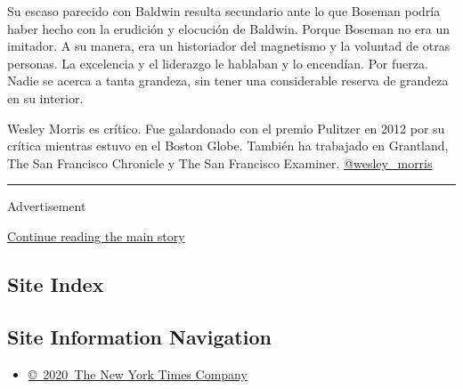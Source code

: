 Su escaso parecido con Baldwin resulta secundario ante lo que Boseman
podría haber hecho con la erudición y elocución de Baldwin. Porque
Boseman no era un imitador. A su manera, era un historiador del
magnetismo y la voluntad de otras personas. La excelencia y el liderazgo
le hablaban y lo encendían. Por fuerza. Nadie se acerca a tanta
grandeza, sin tener una considerable reserva de grandeza en su interior.

Wesley Morris es crítico. Fue galardonado con el premio Pulitzer en 2012
por su crítica mientras estuvo en el Boston Globe. También ha trabajado
en Grantland, The San Francisco Chronicle y The San Francisco Examiner.
\href{https://twitter.com/wesley_morris}{@wesley\_morris}

\begin{center}\rule{0.5\linewidth}{\linethickness}\end{center}

Advertisement

\protect\hyperlink{after-bottom}{Continue reading the main story}

\hypertarget{site-index}{%
\subsection{Site Index}\label{site-index}}

\hypertarget{site-information-navigation}{%
\subsection{Site Information
Navigation}\label{site-information-navigation}}

\begin{itemize}
\tightlist
\item
  \href{https://help.nytimes3xbfgragh.onion/hc/en-us/articles/115014792127-Copyright-notice}{©~2020~The
  New York Times Company}
\end{itemize}

